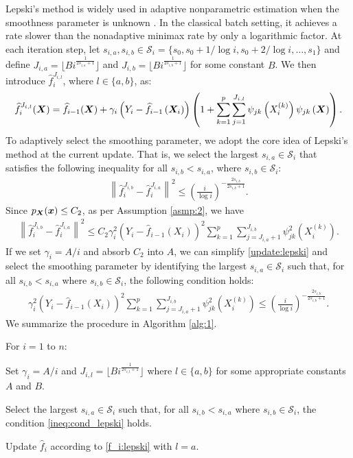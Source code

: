 Lepski's method is widely used in adaptive nonparametric estimation when the smoothness parameter is unknown \citep{doi:10.1137/1135065}. In the classical batch setting, it achieves a rate slower than the nonadaptive minimax rate by only a logarithmic factor.  At each iteration step, let $s_{i,a}, s_{i,b} \in \mathcal{S}_i=\{s_0, s_0 + 1/\log i, s_0 + 2/\log i, \dots, s_1\}$ and define $J_{i,a} = \lfloor Bi^{\frac{1}{2s_{i,a}+1}} \rfloor$ and $ J_{i,b} = \lfloor Bi^{\frac{1}{2s_{i,b}+1}} \rfloor$ for some constant $B$. We then introduce $\hat f_i^{J_{i,l}}$, where $l \in \{a,b\}$,  as: 
\begin{align}\label{f_i:lepski}
    \widehat f_i^{J_{i,l}}(\bm{X}) = \widehat f_{i-1}(\bm{X}) + \gamma_i\left(Y_i - \widehat f_{i-1}\left(\bm{X}_i\right)\right)\left(1+\sum_{k=1}^p\sum_{j=1}^{J_{i,l}}\psi_{jk}\left(X_i^{(k)}\right)\psi_{jk}\left(\bm{X}\right)\right).
\end{align}
To adaptively select the smoothing parameter, we adopt the core idea of Lepski's method at the current update. That is, we select the largest $s_{i,a} \in \mathcal{S}_i$ that satisfies the following inequality for all $s_{i,b} < s_{i,a}$, where $s_{i,b} \in \mathcal{S}_i$:
\begin{align}\label{update:lepski}
\left\|\hat f_i^{J_{i,b}} - \hat f_i^{J_{i,a}}\right\|^2 \leq \left(\frac{i}{\log i}\right)^{-\frac{2s_{i,b}}{2s_{i,b}+1}}.
\end{align}
Since $p_{\bm{X}}(\boldsymbol{x}) \leq C_2$, as per Assumption \ref{asmp:2}, we have
\begin{align*}
    \left\|\hat f_i^{J_{i,b}} - \hat f_i^{J_{i,a}}\right\|^2 \leq C_2\gamma_i^2 \left(Y_i - \hat{f}_{i-1}\left(X_i\right)\right)^2 \sum_{k=1}^p\sum_{j = J_{i,a}+1}^{J_{i,b}}\psi_{jk}^2\left(X_i^{(k)}\right).
\end{align*}
If we set $\gamma_i = A/i$ and absorb $C_2$ into $A$, we can simplify \eqref{update:lepski} and select the smoothing parameter by identifying the largest $s_{i,a} \in \mathcal{S}_i$ such that, for all $s_{i,b} < s_{i,a}$ where $s_{i,b} \in \mathcal{S}_i$, the following condition holds:
\begin{align}\label{ineq:cond_lepski}
    \gamma_i^2 \left(Y_i - \hat{f}_{i-1}\left(X_i\right)\right)^2 \sum_{k=1}^p\sum_{j = J_{i,a}+1}^{J_{i,b}}\psi_{jk}^2\left(X_i^{(k)}\right) \leq \left(\frac{i}{\log i}\right)^{-\frac{2s_{i,b}}{2s_{i,b}+1}}.
\end{align}
We summarize the procedure in Algorithm \ref{alg:1}.
\begin{algorithm}[ht]
\caption{F-SGD with Lepski's method \label{alg:1}}
For $i=1$ to $n$:

\quad Set $\gamma_i = A/i$ and $J_{i,l} = \lfloor Bi^{\frac{1}{2s_{i,l}+1}} \rfloor$ where $l \in \{a,b\}$ for some appropriate constants $A$ and $B$.

\quad Select the largest $s_{i,a} \in \mathcal{S}_i$ such that, for all $s_{i,b} < s_{i,a}$ where $s_{i,b} \in \mathcal{S}_i$, the condition \eqref{ineq:cond_lepski} holds.

\quad Update $\hat f_i$ according to \eqref{f_i:lepski} with $l=a$.
\end{algorithm}

